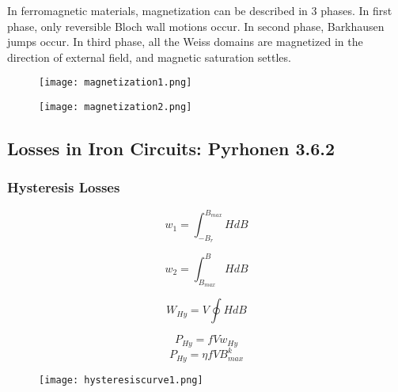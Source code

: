 In ferromagnetic materials, magnetization can be described in 3 phases. In first phase, only reversible Bloch wall motions occur. In second phase, Barkhausen jumps occur. In third phase, all the Weiss domains are magnetized in the direction of external field, and magnetic saturation settles. 





\begin{figure}[h]
    \centering
    \texttt{[image: magnetization1.png]}
    \label{fig:magnetization1}
\end{figure}

\begin{figure}[h]
    \centering
    \texttt{[image: magnetization2.png]}
    \label{fig:magnetization2}
\end{figure}




\subsection{Losses in Iron Circuits: Pyrhonen 3.6.2}

\subsubsection{Hysteresis Losses}

\begin{equation}
	w_{1} = \int_{-B_{r}}^{B_{max}} HdB
\end{equation}



\begin{equation}
	w_{2} = \int_{B_{max}}^{B} HdB
\end{equation}

\begin{equation}
	W_{Hy} = V \oint HdB
\end{equation}

\begin{equation}
	P_{Hy} = f V w_{Hy}
\end{equation}
\begin{equation}
	P_{Hy} = \eta f V B_{max}^{k}
\end{equation}

\begin{figure}[h]
    \centering
    \texttt{[image: hysteresiscurve1.png]}
    \label{fig:hysteresiscurve1}
\end{figure}


